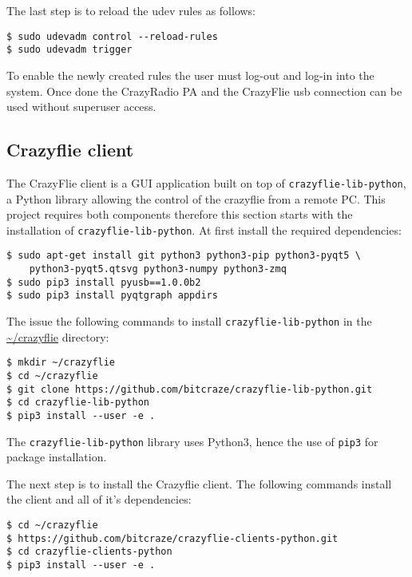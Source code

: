 The last step is to reload the udev rules as follows:
\begin{mdframed}[backgroundcolor=light-gray, linecolor=light-gray]
    \begin{verbatim}
$ sudo udevadm control --reload-rules
$ sudo udevadm trigger
    \end{verbatim}
\end{mdframed}

To enable the newly created rules the user must log-out and log-in into the system. Once done the CrazyRadio PA and the CrazyFlie usb connection can be used without superuser access.

\subsection{Crazyflie client}
The CrazyFlie client is a GUI application built on top of \texttt{crazyflie-lib-python}, a Python library allowing the control of the crazyflie from a remote PC. This project requires both components therefore this section starts with the installation of \texttt{crazyflie-lib-python}.
At first install the required dependencies:

\begin{mdframed}[backgroundcolor=light-gray, linecolor=light-gray]
\begin{Verbatim}
$ sudo apt-get install git python3 python3-pip python3-pyqt5 \
    python3-pyqt5.qtsvg python3-numpy python3-zmq
$ sudo pip3 install pyusb==1.0.0b2
$ sudo pip3 install pyqtgraph appdirs
\end{Verbatim}
\end{mdframed}

The issue the following commands to install \texttt{crazyflie-lib-python} in the \url{~/crazyflie} directory:
\begin{mdframed}[backgroundcolor=light-gray, linecolor=light-gray]
\begin{Verbatim}
$ mkdir ~/crazyflie
$ cd ~/crazyflie
$ git clone https://github.com/bitcraze/crazyflie-lib-python.git
$ cd crazyflie-lib-python
$ pip3 install --user -e .
\end{Verbatim}
\end{mdframed}
The \texttt{crazyflie-lib-python} library uses Python3, hence the use of \texttt{pip3} for package installation.

The next step is to install the Crazyflie client. The following commands install the client and all of it's dependencies:
\begin{mdframed}[backgroundcolor=light-gray, linecolor=light-gray]
\begin{Verbatim}
$ cd ~/crazyflie
$ https://github.com/bitcraze/crazyflie-clients-python.git
$ cd crazyflie-clients-python
$ pip3 install --user -e .
\end{Verbatim}
\end{mdframed}


